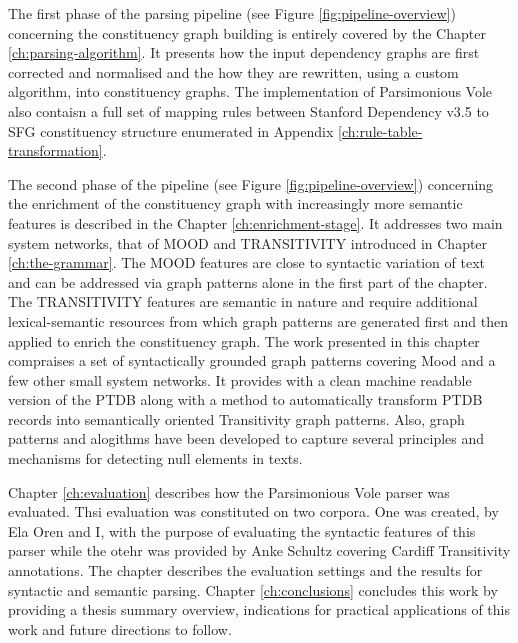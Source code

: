 The first phase of the parsing pipeline (see Figure \ref{fig:pipeline-overview}) concerning the constituency graph building is entirely covered by the Chapter \ref{ch:parsing-algorithm}. It presents how the input dependency graphs are first corrected and normalised and the how they are rewritten, using a custom algorithm, into constituency graphs. The implementation of Parsimonious Vole also contaisn a full set of mapping rules between Stanford Dependency v3.5 to SFG constituency structure enumerated in Appendix \ref{ch:rule-table-transformation}.


The second phase of the pipeline (see Figure \ref{fig:pipeline-overview}) concerning the enrichment of the  constituency graph with increasingly more semantic features is described in the Chapter \ref{ch:enrichment-stage}. It addresses two main system networks, that of MOOD and TRANSITIVITY introduced in Chapter \ref{ch:the-grammar}. The MOOD features are close to syntactic variation of text and can be addressed via graph patterns alone in the first part of the chapter. The TRANSITIVITY features are semantic in nature and require additional lexical-semantic resources from which graph patterns are generated first and then applied to enrich the constituency graph. The work presented in this chapter compraises a set of syntactically grounded graph patterns covering Mood and a few other small system networks. It provides with a clean machine readable version of the PTDB along with a method to automatically transform PTDB records into semantically oriented Transitivity graph patterns. Also, graph patterns and alogithms have been developed to capture several principles and mechanisms for detecting null elements in texts.

Chapter \ref{ch:evaluation} describes how the Parsimonious Vole parser was evaluated. Thsi evaluation was constituted on two corpora. One was created, by Ela Oren and I, with the purpose of evaluating the syntactic features of this parser while the otehr was provided by Anke Schultz covering Cardiff Transitivity annotations. The chapter describes the evaluation settings and the results for syntactic and semantic parsing. Chapter \ref{ch:conclusions} concludes this work by providing a thesis summary overview, indications for practical applications of this work and future directions to follow. 


